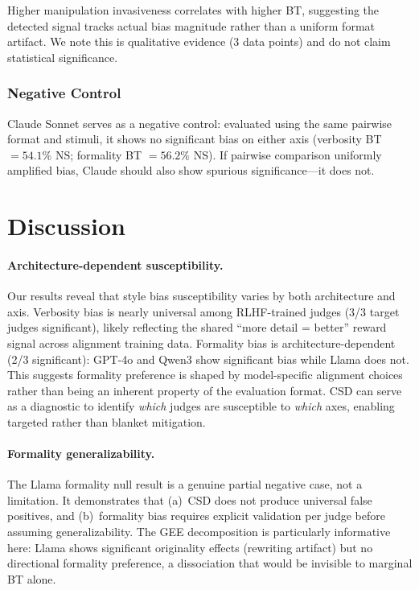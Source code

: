 \documentclass[11pt,a4paper]{article}
\newcommand{\csd}{\textsc{CSD}}
\begin{document}
Higher manipulation invasiveness correlates with higher BT, suggesting the detected signal tracks actual bias magnitude rather than a uniform format artifact. We note this is qualitative evidence (3 data points) and do not claim statistical significance.

\subsubsection{Negative Control}
Claude Sonnet serves as a negative control: evaluated using the same pairwise format and stimuli, it shows no significant bias on either axis (verbosity BT $= 54.1\%$ NS; formality BT $= 56.2\%$ NS). If pairwise comparison uniformly amplified bias, Claude should also show spurious significance---it does not.

\section{Discussion}

\paragraph{Architecture-dependent susceptibility.}
Our results reveal that style bias susceptibility varies by both architecture and axis. Verbosity bias is nearly universal among RLHF-trained judges (3/3 target judges significant), likely reflecting the shared ``more detail = better'' reward signal across alignment training data. Formality bias is architecture-dependent (2/3 significant): GPT-4o and Qwen3 show significant bias while Llama does not. This suggests formality preference is shaped by model-specific alignment choices rather than being an inherent property of the evaluation format. \csd{} can serve as a diagnostic to identify \emph{which} judges are susceptible to \emph{which} axes, enabling targeted rather than blanket mitigation.

\paragraph{Formality generalizability.}
The Llama formality null result is a genuine partial negative case, not a limitation. It demonstrates that (a)~\csd{} does not produce universal false positives, and (b)~formality bias requires explicit validation per judge before assuming generalizability. The GEE decomposition is particularly informative here: Llama shows significant originality effects (rewriting artifact) but no directional formality preference, a dissociation that would be invisible to marginal BT alone.
\end{document}
